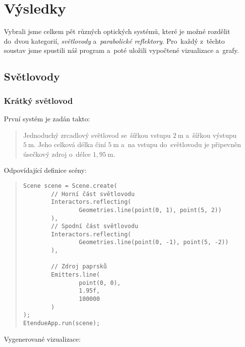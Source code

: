 \chapter{Výsledky}

Vybrali jsme celkem pět různých optických systémů, které je možné rozdělit do~dvou kategorií, \emph{světlovody} a~\emph{parabolické reflektory}. Pro~každý z~těchto soustav jsme spustili náš program a~poté uložili vypočtené vizualizace a~grafy.


\section{Světlovody}
\label{sec:svetlovody}

\subsection{Krátký světlovod}

První systém je zadán takto:

\begin{quote}
    Jednoduchý zrcadlový světlovod se~šířkou vstupu $2\ \mathrm{m}$ a~šířkou výstupu $5\ \mathrm{m}$. Jeho celková délka činí $5\ \mathrm{m}$ a~na vstupu do~světlovodu je připevněn úsečkový zdroj o~délce $1,95\ \mathrm{m}$.
\end{quote}

Odpovídající definice scény:

\begin{minipage}{\textwidth}\begin{quote}\begin{lstlisting}
Scene scene = Scene.create(
        // Horní část světlovodu
        Interactors.reflecting(
                Geometries.line(point(0, 1), point(5, 2))
        ),
        // Spodní část světlovodu
        Interactors.reflecting(
                Geometries.line(point(0, -1), point(5, -2))
        ),

        // Zdroj paprsků
        Emitters.line(
                point(0, 0),
                1.95f,
                100000
        )
);
EtendueApp.run(scene);
\end{lstlisting}\end{quote}\end{minipage}

\beautypage

Vygenerované vizualizace:


